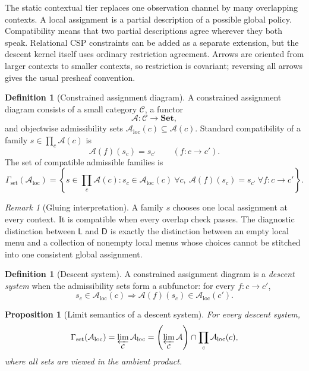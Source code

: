 \documentclass[11pt]{article}
\theoremstyle{plain}
\newtheorem{proposition}[theorem]{Proposition}
\theoremstyle{definition}
\newtheorem{definition}[theorem]{Definition}
\theoremstyle{remark}
\newtheorem{remark}[theorem]{Remark}
\newcommand{\LocalAdm}{\mathcal{A}_{\mathrm{loc}}}
\begin{document}
The static contextual tier replaces one observation channel by many overlapping
contexts. A local assignment is a partial description of a possible global
policy. Compatibility means that two partial descriptions agree wherever they
both speak. Relational CSP constraints can be added as a separate extension, but
the descent kernel itself uses ordinary restriction agreement. Arrows are
oriented from larger contexts to smaller contexts, so restriction is covariant;
reversing all arrows gives the usual presheaf convention.

\begin{definition}[Constrained assignment diagram]\label{def:restr}
A constrained assignment diagram consists of a small category $\mathcal C$, a
functor
\[
\mathcal A:\mathcal C\to\mathbf{Set},
\]
and objectwise admissibility sets
$\LocalAdm(c)\subseteq\mathcal A(c)$. Standard compatibility of a family
$s\in\prod_c\mathcal A(c)$ is
\[
\mathcal A(f)(s_c)=s_{c'}
\qquad(f:c\to c').
\]
The set of compatible admissible families is
\[
\Gamma_{\mathrm{set}}(\LocalAdm)=
\left\{s\in\prod_c\mathcal A(c):
 s_c\in\LocalAdm(c)\ \forall c,
 \ \mathcal A(f)(s_c)=s_{c'}\ \forall f:c\to c'\right\}.
\]
\end{definition}

\begin{remark}[Gluing interpretation]
A family $s$ chooses one local assignment at every context. It is compatible
when every overlap check passes. The diagnostic distinction between $\mathsf L$
and $\mathsf D$ is exactly the distinction between an empty local menu and a
collection of nonempty local menus whose choices cannot be stitched into one
consistent global assignment.
\end{remark}

\begin{definition}[Descent system]\label{def:Av}
A constrained assignment diagram is a \emph{descent system} when the
admissibility sets form a subfunctor: for every $f:c\to c'$,
\[
s_c\in\LocalAdm(c)
\Longrightarrow
\mathcal A(f)(s_c)\in\LocalAdm(c').
\]
\end{definition}

\begin{proposition}[Limit semantics of a descent system]\label{prop:limit-semantics}
For every descent system,
\[
\Gamma_{\mathrm{set}}(\LocalAdm)
=\varprojlim_{\mathcal C}\LocalAdm
=\left(\varprojlim_{\mathcal C}\mathcal A\right)
\cap\prod_c\LocalAdm(c),
\]
where all sets are viewed in the ambient product.
\end{proposition}
\end{document}
